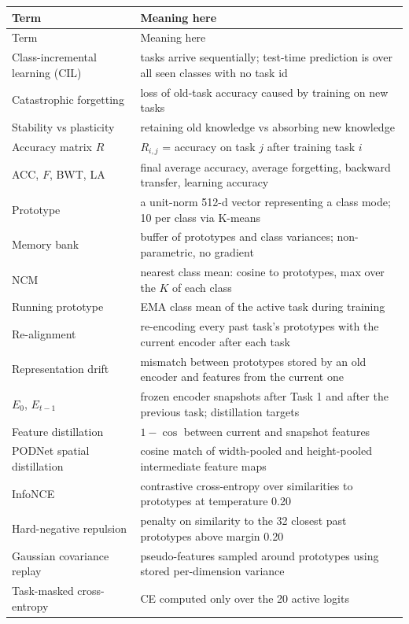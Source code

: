 \documentclass[11pt,a4paper]{article}
\begin{document}
\begin{longtable}{L{4.6cm} L{11.4cm}}
\toprule
Term & Meaning here \\
\midrule
\endfirsthead
\toprule
Term & Meaning here \\
\midrule
\endhead
\bottomrule
\endfoot
Class-incremental learning (CIL) & tasks arrive sequentially; test-time prediction is over all seen classes with no task id \\
Catastrophic forgetting & loss of old-task accuracy caused by training on new tasks \\
Stability vs plasticity & retaining old knowledge vs absorbing new knowledge \\
Accuracy matrix $R$ & $R_{i,j}$ = accuracy on task $j$ after training task $i$ \\
ACC, $F$, BWT, LA & final average accuracy, average forgetting, backward transfer, learning accuracy \\
Prototype & a unit-norm 512-d vector representing a class mode; 10 per class via K-means \\
Memory bank & buffer of prototypes and class variances; non-parametric, no gradient \\
NCM & nearest class mean: cosine to prototypes, max over the $K$ of each class \\
Running prototype & EMA class mean of the active task during training \\
Re-alignment & re-encoding every past task's prototypes with the current encoder after each task \\
Representation drift & mismatch between prototypes stored by an old encoder and features from the current one \\
$E_0$, $E_{t-1}$ & frozen encoder snapshots after Task 1 and after the previous task; distillation targets \\
Feature distillation & $1 - \cos$ between current and snapshot features \\
PODNet spatial distillation & cosine match of width-pooled and height-pooled intermediate feature maps \\
InfoNCE & contrastive cross-entropy over similarities to prototypes at temperature 0.20 \\
Hard-negative repulsion & penalty on similarity to the 32 closest past prototypes above margin 0.20 \\
Gaussian covariance replay & pseudo-features sampled around prototypes using stored per-dimension variance \\
Task-masked cross-entropy & CE computed only over the 20 active logits \\

\end{longtable}
\end{document}
